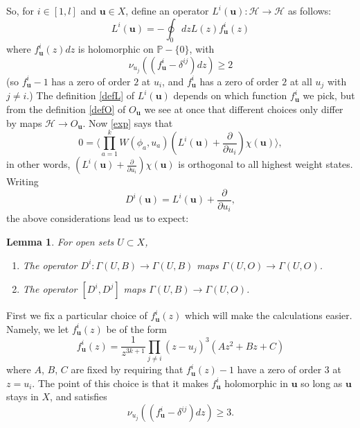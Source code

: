 \documentclass[a4paper,12pt]{article}
\newcommand{\uu}{{\mathbf u}}
\newcommand{\PP}{{\mathbb P}}
\newcommand{\F}{{\mathcal H}}
\newcommand{\IP}[1]{\langle#1\rangle}
\newcommand{\dwrt}[1]{\frac{\partial}{\partial#1}}
\newtheorem{lem}[defn]{Lemma}
\newcommand{\oproof}[1]{\noindent {\bf Proof#1.\ }}
\begin{document}
So, for $i \in [1,l]$ and $\uu \in X$, define an 
operator $L^i(\uu): \F \to \F$ as follows:  
\begin{equation} \label{defL}
L^i(\uu) = -\oint_0 dz L(z) f^i_\uu(z)
\end{equation}
where $f^i_\uu(z) dz$ is holomorphic on $\PP - \{0\}$, with 
\begin{equation} \label{fcond}
\nu_{u_j} ((f^i_\uu - \delta^{ij}) dz) \ge 2
\end{equation}
(so $f^i_\uu - 1$ has a zero of order $2$ at $u_i$, and $f^i_\uu$ has a zero of order $2$ at all $u_j$ with $j \ne i$.) 
The definition \eqref{defL} of $L^i(\uu)$ depends on which function $f^i_\uu$
we pick, but from the definition \eqref{defO} of $O_\uu$ we see at once that different choices only differ by maps $\F \to O_\uu$.
Now \eqref{exp} says that
\begin{equation}
0 = \IP{\prod_{a=1}^k W(\phi_a, u_a) \left( L^i(\uu) + \dwrt{u_i} \right) \chi(\uu)},
\end{equation}
in other words, $\left( L^i(\uu) + \dwrt{u_i} \right) \chi(\uu)$ is orthogonal to all highest weight states.
Writing 
\begin{equation} \label{defcon}
D^i(\uu) = L^i(\uu) + \dwrt{u_i},
\end{equation}
the above considerations lead us to expect:

\begin{lem} \label{dpres} For open sets $U \subset X$,
\begin{enumerate}
\item The operator $D^i: \Gamma(U,B) \to \Gamma(U,B)$ maps $\Gamma(U,O) \to \Gamma(U,O)$.
\item The operator $[D^i, D^j]$ maps $\Gamma(U,B) \to \Gamma(U,O)$.
\end{enumerate}
\end{lem}
\oproof{} First we fix a particular choice of $f^i_\uu(z)$ which will make the calculations easier.
Namely, we let $f^i_\uu(z)$ be of the form
\begin{equation}
f^i_\uu(z) = \frac{1}{z^{3k+1}} \prod_{j \ne i} (z-u_j)^3 (Az^2 + Bz + C)
\end{equation}
where $A$, $B$, $C$ are fixed by requiring that $f^i_\uu(z) - 1$ have a zero of order $3$ at $z = u_i$.
The point of this choice is that it makes $f^i_\uu$ holomorphic in $\uu$ so long as $\uu$ stays in $X$,
and satisfies 
\begin{equation} \label{cond3}
\nu_{u_j} \left((f^i_\uu - \delta^{ij}) dz \right) \ge 3.
\end{equation}
\end{document}

